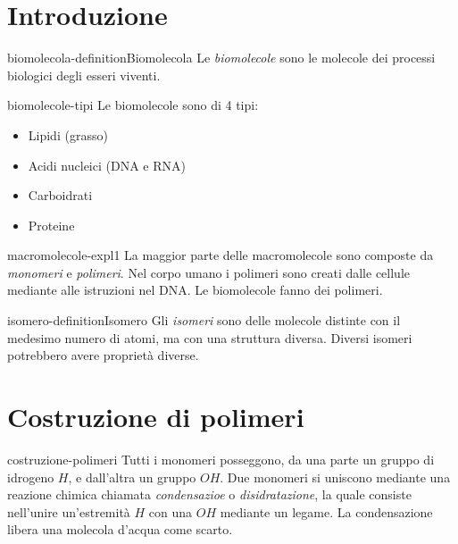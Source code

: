 \documentclass[preview]{standalone}
\begin{document}
\genpage

\section{Introduzione}

\begin{snippetdefinition}{biomolecola-definition}{Biomolecola}
    Le \textit{biomolecole} sono le molecole dei processi biologici degli esseri viventi.
\end{snippetdefinition}


\begin{snippet}{biomolecole-tipi}
    Le biomolecole sono di 4 tipi:
    \begin{itemize}
        \item Lipidi (grasso)
        \item Acidi nucleici (DNA e RNA)
        \item Carboidrati
        \item Proteine
    \end{itemize}
\end{snippet}

\begin{snippet}{macromolecole-expl1}
    La maggior parte delle macromolecole sono composte da \textit{monomeri} e \textit{polimeri}.
    Nel corpo umano i polimeri sono creati dalle cellule mediante alle istruzioni nel DNA.
    Le biomolecole fanno dei polimeri.
\end{snippet}

\begin{snippetdefinition}{isomero-definition}{Isomero}
    Gli \textit{isomeri} sono delle molecole distinte con il medesimo numero di atomi,
    ma con una struttura diversa. Diversi isomeri potrebbero avere proprietà diverse.
\end{snippetdefinition}

\section{Costruzione di polimeri}

\begin{snippet}{costruzione-polimeri}
    Tutti i monomeri posseggono, da una parte un gruppo di idrogeno \(H\),
e dall'altra un gruppo \(OH\).
Due monomeri si uniscono mediante una reazione chimica chiamata \textit{condensazioe} o \textit{disidratazione}, la quale consiste
nell'unire un'estremità \(H\) con una \(OH\) mediante un legame.
La condensazione libera una molecola d'acqua come scarto.
\end{snippet}
\end{document}
